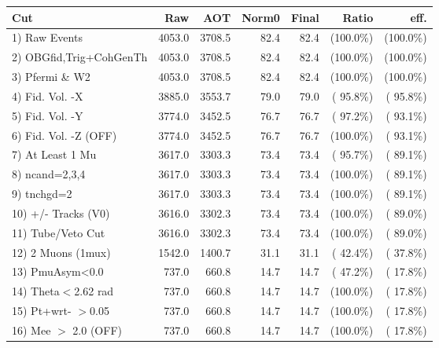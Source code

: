  \begin{table}[h!]\centering
 \begin{tabular}{||l||r|r|r|r|r|r||}
 \hline
 \hline
 Cut & Raw & AOT & Norm0 & Final & Ratio & eff.       \\
 \hline
  1) Raw Events           &       4053.0 &       3708.5 &         82.4 &         82.4 & (100.0\%) & (100.0\%) \\
  2) OBGfid,Trig+CohGenTh &       4053.0 &       3708.5 &         82.4 &         82.4 & (100.0\%) & (100.0\%) \\
  3) Pfermi \& W2         &       4053.0 &       3708.5 &         82.4 &         82.4 & (100.0\%) & (100.0\%) \\
  4) Fid. Vol. -X         &       3885.0 &       3553.7 &         79.0 &         79.0 & ( 95.8\%) & ( 95.8\%) \\
  5) Fid. Vol. -Y         &       3774.0 &       3452.5 &         76.7 &         76.7 & ( 97.2\%) & ( 93.1\%) \\
  6) Fid. Vol. -Z (OFF)   &       3774.0 &       3452.5 &         76.7 &         76.7 & (100.0\%) & ( 93.1\%) \\
  7) At Least 1 Mu        &       3617.0 &       3303.3 &         73.4 &         73.4 & ( 95.7\%) & ( 89.1\%) \\
  8) ncand=2,3,4          &       3617.0 &       3303.3 &         73.4 &         73.4 & (100.0\%) & ( 89.1\%) \\
  9) tnchgd=2             &       3617.0 &       3303.3 &         73.4 &         73.4 & (100.0\%) & ( 89.1\%) \\
 10) +/- Tracks (V0)      &       3616.0 &       3302.3 &         73.4 &         73.4 & (100.0\%) & ( 89.0\%) \\
 11) Tube/Veto Cut        &       3616.0 &       3302.3 &         73.4 &         73.4 & (100.0\%) & ( 89.0\%) \\
 12) 2 Muons (1mux)       &       1542.0 &       1400.7 &         31.1 &         31.1 & ( 42.4\%) & ( 37.8\%) \\
 13) PmuAsym<0.0          &        737.0 &        660.8 &         14.7 &         14.7 & ( 47.2\%) & ( 17.8\%) \\
 14) Theta$<$2.62 rad     &        737.0 &        660.8 &         14.7 &         14.7 & (100.0\%) & ( 17.8\%) \\
 15) Pt+wrt- $>$0.05      &        737.0 &        660.8 &         14.7 &         14.7 & (100.0\%) & ( 17.8\%) \\
 16) Mee $>$ 2.0  (OFF)   &        737.0 &        660.8 &         14.7 &         14.7 & (100.0\%) & ( 17.8\%) \\

\end{tabular}
\end{table}
